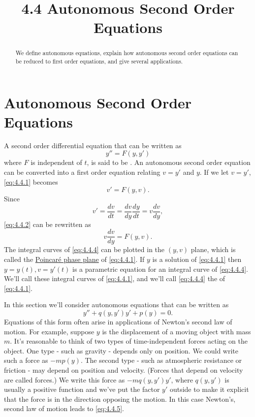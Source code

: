 \documentclass{ximera}
\title{4.4 Autonomous Second Order Equations}%
\begin{document}
 
\begin{abstract}
 We define autonomous equations, explain how autonomous second order equations can be reduced to first order equations, and give several applications.
\end{abstract}
 
\maketitle
 
\section*{Autonomous Second Order Equations}
 
A second order differential equation that can be written as
\begin{equation} \label{eq:4.4.1}
y''=F(y,y')
\end{equation}
where $F$ is independent of $t$, is said to be .
An autonomous second order equation can be converted into a first
order equation relating $v=y'$ and $y$. If we let $v=y'$,
\eqref{eq:4.4.1} becomes
\begin{equation} \label{eq:4.4.2}
v'=F(y,v).
\end{equation}
Since
\begin{equation} \label{eq:4.4.3}
v'=\frac{dv}{dt}=\frac{dv}{dy}\frac{dy}{dt}=v\frac{dv}{dy},
\end{equation}
\eqref{eq:4.4.2} can be rewritten as
\begin{equation} \label{eq:4.4.4}
v\frac{dv}{dy}=F(y,v).
\end{equation}
The integral curves of \eqref{eq:4.4.4} can be plotted in the $(y,v)$
plane, which is called the
\href{http://www-history.mcs.st-and.ac.uk/Mathematicians/Poincare.html}{Poincar\'e phase plane} of \eqref{eq:4.4.1}. If $y$ is a solution of
\eqref{eq:4.4.1}
then $y=y(t), v=y'(t)$ is a parametric equation for an integral curve
of \eqref{eq:4.4.4}. We'll call these integral curves  of \eqref{eq:4.4.1}, and we'll call
\eqref{eq:4.4.4} the  of \eqref{eq:4.4.1}.
 
In this section we'll consider  autonomous equations
that can be written as
\begin{equation} \label{eq:4.4.5}
y''+q(y,y')y'+p(y)=0.
\end{equation}
Equations of this form often arise in applications of Newton's second
law of motion. For example, suppose  $y$ is the displacement of a
moving object with mass $m$. It's  reasonable to think of two
types of time-independent forces acting on the object. One type - such
as gravity - depends only on position. We could write such a force as
$-mp(y)$. The second type - such as atmospheric resistance or friction
- may depend on position and velocity. (Forces that depend on velocity
are called  forces.) We  write this force as
$-mq(y,y')y'$, where $q(y,y')$ is usually a positive function and
we've put the factor $y'$ outside  to make it
explicit that the force
is in the direction opposing the motion. In this case Newton's, second
law of motion leads to \eqref{eq:4.4.5}.
 
\end{document}
